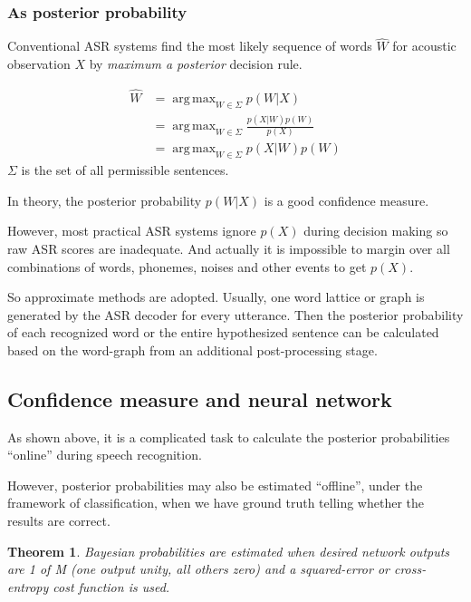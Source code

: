 \documentclass[11pt,a4paper]{report}
\DeclareMathOperator*{\argmax}{arg\,max}
\newtheorem*{theorem}{Theorem}
\begin{document}
\subsubsection{As posterior probability}

Conventional ASR systems find the most likely sequence of words \(\hat{W}\) for acoustic observation \(X\) by \textit{maximum a posterior} decision rule.

\begin{equation}
  \begin{split}
    \hat{W} & = \argmax_{W \in \Sigma} p(W|X) \\
      & = \argmax_{W \in \Sigma} \frac{p(X|W) p(W)}{p(X)} \\
      & = \argmax_{W \in \Sigma} p(X|W) p(W)
  \end{split}
\end{equation}
\(\Sigma\) is the set of all permissible sentences.

In theory, the posterior probability \(p(W|X)\) is a good confidence measure.

However, most practical ASR systems ignore \(p(X)\) during decision making so raw ASR scores are inadequate.
And actually it is impossible to margin over all combinations of words, phonemes, noises and other events to get \(p(X)\).

So approximate methods are adopted.
Usually, one word lattice or graph is generated by the ASR decoder for every utterance.
Then the posterior probability of each recognized word or the entire hypothesized sentence can be calculated based on the word-graph from an additional post-processing stage.

\subsection{Confidence measure and neural network}

As shown above, it is a complicated task to calculate the posterior probabilities \enquote{online} during speech recognition.

However, posterior probabilities may also be estimated \enquote{offline}, under the framework of classification, when we have ground truth telling whether the results are correct.

\bigskip

\begin{mdframed}
\begin{theorem}
  Bayesian probabilities are estimated when desired network outputs are 1 of M (one output unity, all others zero) and a squared-error or cross-entropy cost function is used. \parencite{richard1991neural}
\end{theorem}
\end{mdframed}
\end{document}
